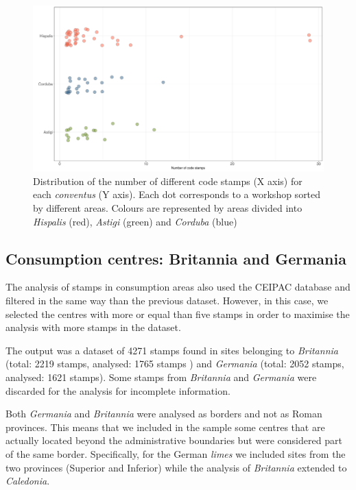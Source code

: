 \documentclass[review]{elsarticle}
\begin{document}
\begin{figure}[htp]
	\centering
\includegraphics[width=\linewidth]{figs/frequency}
\caption{Distribution of the number of different code stamps (X axis) for each \textit{conventus} (Y axis). Each dot corresponds to a workshop sorted by different areas. Colours are represented by areas divided into \textit{Hispalis} (red), \textit{Astigi} (green) and \textit{Corduba} (blue)}
\label{frequency}
\end{figure} 


\subsection{Consumption centres: Britannia and Germania}

The analysis of stamps in consumption areas also used the CEIPAC database and filtered in the same way than the previous dataset. However, in this case, we selected the centres with more or equal than five stamps in order to maximise the analysis with more stamps in the dataset.   

The output was a dataset of 4271 stamps found in sites belonging to \textit{Britannia} (total: 2219 stamps, analysed: 1765 stamps ) and \textit{Germania} (total: 2052 stamps, analysed: 1621 stamps). Some stamps from \textit{Britannia} and \textit{Germania} were discarded for the analysis for incomplete information.  

Both \textit{Germania} and \textit{Britannia} were analysed as borders and not as Roman provinces. This means that we included in the sample some centres that are actually located beyond the administrative boundaries but were considered part of the same border. Specifically, for the German \textit{limes} we included sites from the two provinces (Superior and Inferior) while the analysis of \textit{Britannia} extended to \textit{Caledonia}.
 
\end{document}
